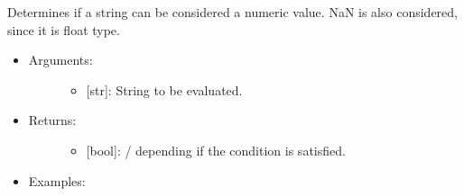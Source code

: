 \documentclass[letterpaper,10pt,english]{sphinxmanual}
\begin{document}
\begin{fulllineitems}
\label{\detokenize{strings:data_tools.strings.is_numeric}}
Determines if a string can be considered a numeric value. NaN is
also considered, since it is float type.
\begin{itemize}
\item {} \begin{description}
\item[{Arguments:}] \leavevmode\begin{itemize}
\item {} 
 {[}str{]}: String to be evaluated.

\end{itemize}

\end{description}

\item {} \begin{description}
\item[{Returns:}] \leavevmode\begin{itemize}
\item {} 
{[}bool{]}: / depending if the condition is
satisfied.

\end{itemize}

\end{description}

\item {} \begin{description}
\item[{Examples:}] \leavevmode
{}%
\begin{sphinxVerbatim}[commandchars=\\\{\}]
\end{sphinxVerbatim}

\end{description}

\end{itemize}

\end{fulllineitems}
\end{document}
